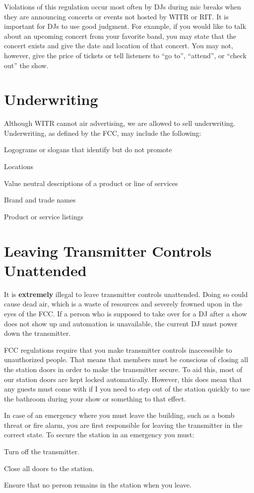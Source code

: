 \documentclass{witrman}
\begin{document}
Violations of this regulation occur most often by DJs during mic breaks when
they are announcing concerts or events not hosted by WITR or RIT. It is
important for DJs to use good judgment. For example, if you would like to talk
about an upcoming concert from your favorite band, you may state that the
concert exists and give the date and location of that concert. You may not,
however, give the price of tickets or tell listeners to ``go to'', ``attend'',
or ``check out'' the show.

\section{Underwriting}
Although WITR cannot air advertising, we are allowed to sell underwriting.
Underwriting, as defined by the FCC, may include the following:
\begin{skinnyitemize}
    \item Logograms or slogans that identify but do not promote
    \item Locations
    \item Value neutral descriptions of a product or line of services
    \item Brand and trade names
    \item Product or service listings
\end{skinnyitemize}

\section{Leaving Transmitter Controls Unattended}
It is \textbf{extremely} illegal to leave transmitter controls unattended. Doing
so could cause dead air, which is a waste of resources and severely frowned upon
in the eyes of the FCC. If a person who is supposed to take over for a DJ after
a show does not show up and automation is unavailable, the current DJ must power
down the transmitter.

FCC regulations require that you make transmitter controls inaccessible to
unauthorized people. That means that members must be conscious of closing all
the station doors in order to make the transmitter secure. To aid this, most of
our station doors are kept locked automatically. However, this does mean that
any guests must come with if I you need to step out of the station quickly to
use the bathroom during your show or something to that effect.

In case of an emergency where you must leave the building, such as a bomb threat
or fire alarm, you are first responsible for leaving the transmitter in the
correct state. To secure the station in an emergency you must:
\begin{skinnyenumerate}
    \item Turn off the transmitter.
    \item Close all doors to the station.
    \item Ensure that no person remains in the station when you leave.
\end{skinnyenumerate}
\end{document}
